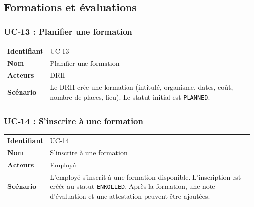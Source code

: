 \documentclass[a4paper,12pt,openany]{book}
\begin{document}

    \subsection{Formations et évaluations}

    \subsubsection*{UC-13 : Planifier une formation}
    \begin{table}[H]
        \centering
        \begin{tabularx}{\textwidth}{lX}
    \toprule
    \textbf{Identifiant} & UC-13 \\
    \textbf{Nom}         & Planifier une formation \\
    \textbf{Acteurs}     & DRH \\
    \midrule
    \textbf{Scénario} & Le DRH crée une formation (intitulé, organisme, dates, coût, nombre de places, lieu). Le statut initial est \texttt{PLANNED}. \\
    \bottomrule
        \end{tabularx}
    \end{table}

    \subsubsection*{UC-14 : S'inscrire à une formation}
    \begin{table}[H]
        \centering
        \begin{tabularx}{\textwidth}{lX}
    \toprule
    \textbf{Identifiant} & UC-14 \\
    \textbf{Nom}         & S'inscrire à une formation \\
    \textbf{Acteurs}     & Employé \\
    \midrule
    \textbf{Scénario} & L'employé s'inscrit à une formation disponible. L'inscription est créée au statut \texttt{ENROLLED}. Après la formation, une note d'évaluation et une attestation peuvent être ajoutées. \\
    \bottomrule
        \end{tabularx}
    \end{table}
\end{document}

